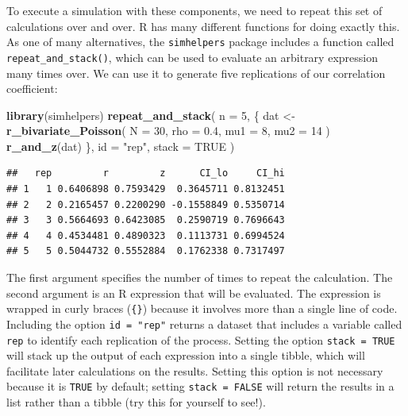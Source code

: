 \documentclass[
]{book}
\newenvironment{Shaded}{\begin{snugshade}}{\end{snugshade}}
\newcommand{\AttributeTok}[1]{\textcolor[rgb]{0.13,0.29,0.53}{#1}}
\newcommand{\ConstantTok}[1]{\textcolor[rgb]{0.56,0.35,0.01}{#1}}
\newcommand{\DecValTok}[1]{\textcolor[rgb]{0.00,0.00,0.81}{#1}}
\newcommand{\FloatTok}[1]{\textcolor[rgb]{0.00,0.00,0.81}{#1}}
\newcommand{\FunctionTok}[1]{\textcolor[rgb]{0.13,0.29,0.53}{\textbf{#1}}}
\newcommand{\NormalTok}[1]{#1}
\newcommand{\OtherTok}[1]{\textcolor[rgb]{0.56,0.35,0.01}{#1}}
\newcommand{\StringTok}[1]{\textcolor[rgb]{0.31,0.60,0.02}{#1}}
\begin{document}
To execute a simulation with these components, we need to repeat this set of calculations over and over.
R has many different functions for doing exactly this.
As one of many alternatives, the \texttt{simhelpers} package includes a function called \texttt{repeat\_and\_stack()}, which can be used to evaluate an arbitrary expression many times over.
We can use it to generate five replications of our correlation coefficient:

\begin{Shaded}
\begin{Highlighting}[]
\FunctionTok{library}\NormalTok{(simhelpers)}
\FunctionTok{repeat\_and\_stack}\NormalTok{(}
  \AttributeTok{n =} \DecValTok{5}\NormalTok{, }
\NormalTok{  \{}
\NormalTok{    dat }\OtherTok{\textless{}{-}} \FunctionTok{r\_bivariate\_Poisson}\NormalTok{( }\AttributeTok{N =} \DecValTok{30}\NormalTok{, }\AttributeTok{rho =} \FloatTok{0.4}\NormalTok{, }\AttributeTok{mu1 =} \DecValTok{8}\NormalTok{, }\AttributeTok{mu2 =} \DecValTok{14}\NormalTok{ )}
    \FunctionTok{r\_and\_z}\NormalTok{(dat)}
\NormalTok{  \}, }
  \AttributeTok{id =} \StringTok{"rep"}\NormalTok{, }
  \AttributeTok{stack =} \ConstantTok{TRUE}
\NormalTok{)}
\end{Highlighting}
\end{Shaded}

\begin{verbatim}
##   rep         r         z      CI_lo     CI_hi
## 1   1 0.6406898 0.7593429  0.3645711 0.8132451
## 2   2 0.2165457 0.2200290 -0.1558849 0.5350714
## 3   3 0.5664693 0.6423085  0.2590719 0.7696643
## 4   4 0.4534481 0.4890323  0.1113731 0.6994524
## 5   5 0.5044732 0.5552884  0.1762338 0.7317497
\end{verbatim}

The first argument specifies the number of times to repeat the calculation.
The second argument is an R expression that will be evaluated.
The expression is wrapped in curly braces (\texttt{\{\}}) because it involves more than a single line of code.
Including the option \texttt{id\ =\ "rep"} returns a dataset that includes a variable called \texttt{rep} to identify each replication of the process.
Setting the option \texttt{stack\ =\ TRUE} will stack up the output of each expression into a single tibble, which will facilitate later calculations on the results.
Setting this option is not necessary because it is \texttt{TRUE} by default; setting \texttt{stack\ =\ FALSE} will return the results in a list rather than a tibble (try this for yourself to see!).
\end{document}
